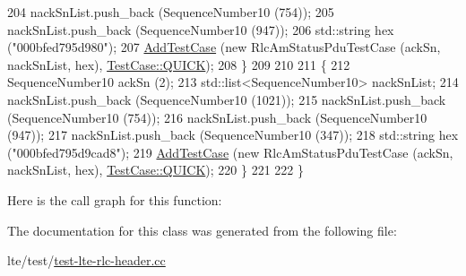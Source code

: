 \begin{DoxyCode}
204     nackSnList.push\_back (SequenceNumber10 (754));
205     nackSnList.push\_back (SequenceNumber10 (947));
206     std::string hex (\textcolor{stringliteral}{"000bfed795d980"});
207     \hyperlink{classns3_1_1TestCase_a3718088e3eefd5d6454569d2e0ddd835}{AddTestCase} (\textcolor{keyword}{new} RlcAmStatusPduTestCase (ackSn, nackSnList, hex), 
      \hyperlink{classns3_1_1TestCase_a11f6f57c21a0d32e605d192a89550f91ac2f47fb646e77f4ce7d662a69120965f}{TestCase::QUICK});
208   \}
209 
210 
211   \{
212     SequenceNumber10 ackSn (2);
213     std::list<SequenceNumber10> nackSnList;
214     nackSnList.push\_back (SequenceNumber10 (1021));
215     nackSnList.push\_back (SequenceNumber10 (754));
216     nackSnList.push\_back (SequenceNumber10 (947));
217     nackSnList.push\_back (SequenceNumber10 (347));
218     std::string hex (\textcolor{stringliteral}{"000bfed795d9cad8"});
219     \hyperlink{classns3_1_1TestCase_a3718088e3eefd5d6454569d2e0ddd835}{AddTestCase} (\textcolor{keyword}{new} RlcAmStatusPduTestCase (ackSn, nackSnList, hex), 
      \hyperlink{classns3_1_1TestCase_a11f6f57c21a0d32e605d192a89550f91ac2f47fb646e77f4ce7d662a69120965f}{TestCase::QUICK});
220   \}
221 
222 \}
\end{DoxyCode}


Here is the call graph for this function\+:




The documentation for this class was generated from the following file\+:\begin{DoxyCompactItemize}
\item 
lte/test/\hyperlink{test-lte-rlc-header_8cc}{test-\/lte-\/rlc-\/header.\+cc}\end{DoxyCompactItemize}
